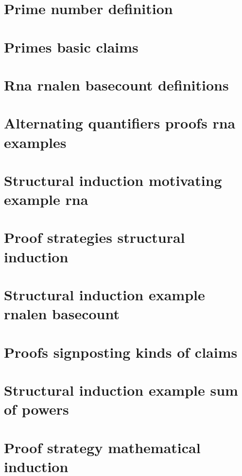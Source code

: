 \section*{Prime number definition}

\vfill
\section*{Primes basic claims}

\vfill
\section*{Rna rnalen basecount definitions}

\vfill
\section*{Alternating quantifiers proofs rna examples}

\vfill
\section*{Structural induction motivating example rna}

\vfill
\section*{Proof strategies structural induction}

\vfill
\section*{Structural induction example rnalen basecount}

\vfill
\section*{Proofs signposting kinds of claims}

\vfill
\section*{Structural induction example sum of powers}

\vfill
\section*{Proof strategy mathematical induction}

\vfill
